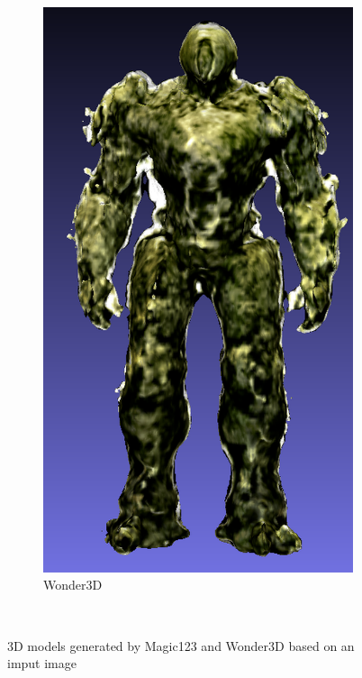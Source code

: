\begin{figure}[H]
\begin{subfigure}[b]{0.21\textwidth}
        \includegraphics[width=\textwidth]{etc/a robot made out of plants/wonder3d/wonder3d_plantrobot_model_resized}
        \caption{Wonder3D}
    \end{subfigure}
    \caption{3D models generated by Magic123 and Wonder3D based on an imput image}~\label{fig:inputAndModel}
  \end{figure}